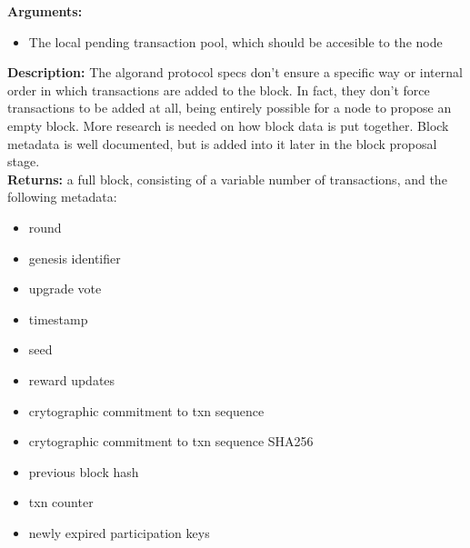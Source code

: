 \documentclass[10pt,a4paper]{article}
\begin{document}
\textbf{Arguments:}
\begin{itemize}
    \item The local pending transaction pool, which should be accesible to the node
  \end{itemize}

\textbf{Description:}
The algorand protocol specs don't ensure a specific way or internal order in which transactions are added to the block.
In fact, they don't force transactions to be added at all, being entirely possible for a node to propose an empty block.
More research is needed on how block data is put together.
Block metadata is well documented, but is added into it later in the block proposal stage.\\

\textbf{Returns:} a full block, consisting of a variable number of transactions, and the following metadata:
\begin{itemize}
    \item round
    \item genesis identifier
    \item upgrade vote
    \item timestamp
    \item seed
    \item reward updates
    \item crytographic commitment to txn sequence
    \item crytographic commitment to txn sequence SHA256
    \item previous block hash
    \item txn counter
    \item newly expired participation keys
  \end{itemize}
\end{document}
